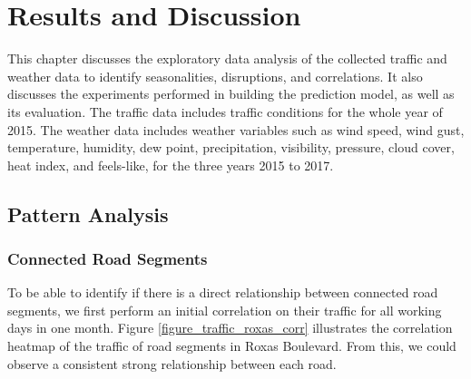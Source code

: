 \chapter{Results and Discussion}

This chapter discusses the exploratory data analysis of the collected traffic and weather data to identify seasonalities, disruptions, and correlations. It also discusses the experiments performed in building the prediction model, as well as its evaluation. The traffic data includes traffic conditions for the whole year of 2015. The weather data includes weather variables such as wind speed, wind gust, temperature, humidity, dew point, precipitation, visibility, pressure, cloud cover, heat index, and feels-like, for  the three years 2015 to 2017.

\section{Pattern Analysis}
\subsection{Connected Road Segments}
To be able to identify if there is a direct relationship between connected road segments, we first perform an initial correlation on their traffic for all working days in one month. Figure \ref{figure_traffic_roxas_corr} illustrates the correlation heatmap of the traffic of road segments in Roxas Boulevard. From this, we could observe a consistent strong relationship between each road. 


